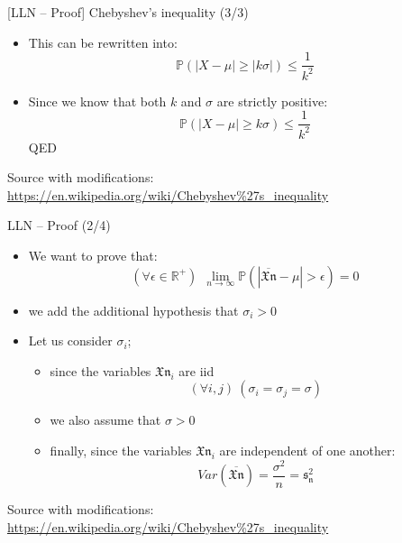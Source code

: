 \documentclass{beamer}
\begin{document}
\begin{frame}
{\centerline{[LLN -- Proof] Chebyshev's inequality (3/3)}}

\begin{itemize}
\item This can be rewritten into:
$$\mathbb{P} ( |X - \mu|  \geq |k\sigma|) \leq  \frac{1}{k^2}$$
\item Since we know that both $k$ and $\sigma$ are strictly positive:
$$\mathbb{P} ( |X - \mu|  \geq k\sigma) \leq  \frac{1}{k^2}$$
QED


\end{itemize}


\begin{center}
\tiny 
Source with modifications: \url{https://en.wikipedia.org/wiki/Chebyshev\%27s_inequality}
\end{center}
\end{frame}


\begin{frame}
{\centerline{LLN -- Proof (2/4)}}

\begin{itemize}
\item We want to prove that:
$$(\forall \epsilon \in \mathbb{R}^+) ~~ \lim_{n \to \infty} \mathbb{P} ( | \overline{\mathfrak{Xn}} - \mu |  > \epsilon ) = 0$$
\item we add the additional hypothesis that $\sigma_i > 0$
\item Let us consider $\sigma_i$; 
\begin{itemize}
\item since the variables $\mathfrak{Xn}_i$ are iid
$$(\forall i, j) ~ (\sigma_i = \sigma_j = \sigma) $$
\item we also assume that $\sigma > 0$
\item finally, since the variables $\mathfrak{Xn}_i$ are independent of one another:
$$Var(\overline{\mathfrak{Xn}}) = \frac{\sigma^2}{n} = \mathfrak{s_n^2}$$
\end{itemize}
\end{itemize}


\begin{center}
\tiny 
Source with modifications: \url{https://en.wikipedia.org/wiki/Chebyshev\%27s_inequality}
\end{center}
\end{frame}
\end{document}

